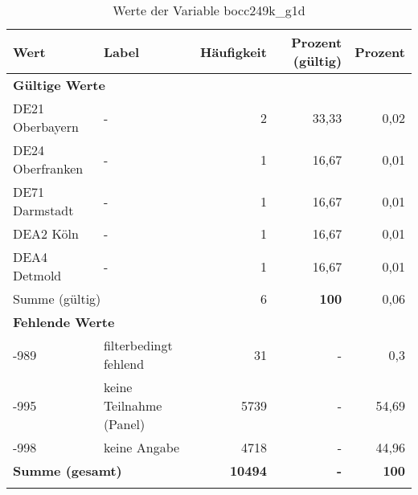      \begin{longtable}{Xlrrr}
     \toprule
     \textbf{Wert} & \textbf{Label} & \textbf{Häufigkeit} & \textbf{Prozent (gültig)} & \textbf{Prozent} \\
     \endhead
     \midrule
     \multicolumn{5}{l}{\textbf{Gültige Werte}}\\

     \multicolumn{1}{X}{DE21 Oberbayern} &
     - &
     2 &
     33,33 &
     0,02 \\

     \multicolumn{1}{X}{DE24 Oberfranken} &
     - &
     1 &
     16,67 &
     0,01 \\

     \multicolumn{1}{X}{DE71 Darmstadt} &
     - &
     1 &
     16,67 &
     0,01 \\

     \multicolumn{1}{X}{DEA2 Köln} &
     - &
     1 &
     16,67 &
     0,01 \\

     \multicolumn{1}{X}{DEA4 Detmold} &
     - &
     1 &
     16,67 &
     0,01 \\
     \midrule
      \multicolumn{2}{l}{Summe (gültig)} & 6 &
      \textbf{100} &
         0,06 \\
     \multicolumn{5}{l}{\textbf{Fehlende Werte}}\\
       -989 & filterbedingt fehlend & 31 & - & 0,3 \\

       -995 & keine Teilnahme (Panel) & 5739 & - & 54,69 \\

       -998 & keine Angabe & 4718 & - & 44,96 \\

     \midrule
     \multicolumn{2}{l}{\textbf{Summe (gesamt)}} & \textbf{10494} & \textbf{-} & \textbf{100} \\
     \bottomrule
     \caption{Werte der Variable bocc249k\_g1d}
     \end{longtable}
     
